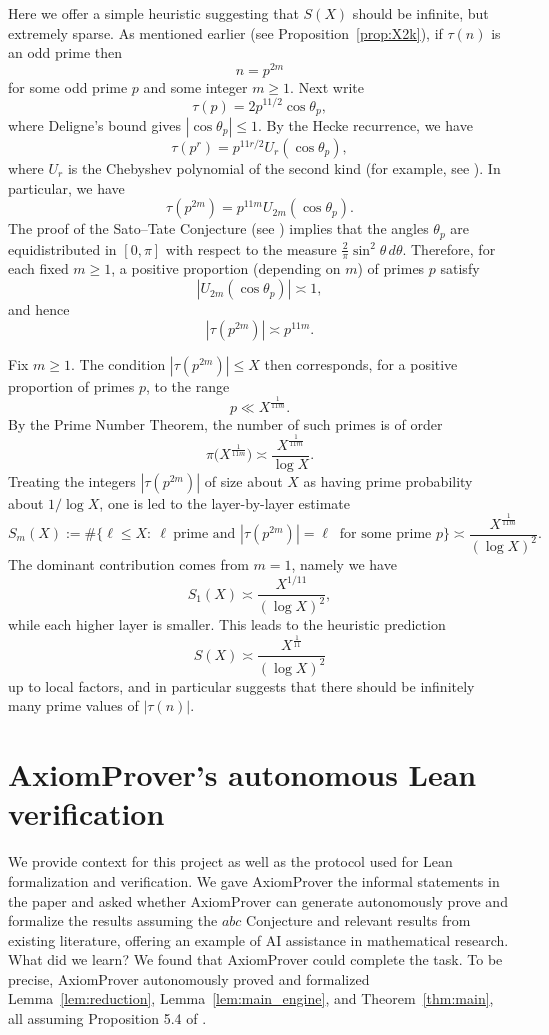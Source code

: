 \documentclass[12pt]{amsart}
\theoremstyle{remark}
\numberwithin{equation}{section}
\begin{document}
Here we offer a simple heuristic suggesting that $S(X)$ should be infinite, but extremely sparse.
As mentioned earlier (see Proposition~\ref{prop:X2k}),
if $\tau(n)$ is an odd prime then
\[ n=p^{2m} \]
for some odd prime $p$ and some integer $m\ge 1$. Next write
\[
\tau(p)=2p^{11/2}\cos\theta_p,
\]
where Deligne's bound gives $\left\lvert \cos\theta_p \right\rvert \le 1$. By the Hecke recurrence, we have
\[
\tau(p^r)=p^{11r/2}U_r(\cos\theta_p),
\]
where $U_r$ is the Chebyshev polynomial of the second kind (for example, see \cite{MasonHandscomb2002}). In particular, we have
\[
\tau(p^{2m})=p^{11m}U_{2m}(\cos\theta_p).
\]
The proof of the Sato--Tate Conjecture (see \cite{BarnetLambGeeGeraghty2011})
implies that the angles $\theta_p$ are equidistributed in $[0,\pi]$
with respect to the measure $\frac{2}{\pi}\sin^2\theta\,d\theta$.
Therefore, for each fixed $m\ge 1$, a positive proportion (depending on $m$) of primes $p$ satisfy
\[
|U_{2m}(\cos\theta_p)|\asymp 1,
\]
and hence
\[
|\tau(p^{2m})|\asymp p^{11m}.
\]

Fix $m\ge 1$. The condition $|\tau(p^{2m})|\le X$ then corresponds, for a positive proportion of primes $p$, to the range
\[
p\ll X^{\frac{1}{11m}}.
\]
By the Prime Number Theorem, the number of such primes is of order
\[
\pi\bigl(X^{\frac{1}{11m}}\bigr)\asymp \frac{X^{\frac{1}{11m}}}{\log X}.
\]
Treating the integers $|\tau(p^{2m})|$ of size about $X$ as having prime probability about $1/\log X$, one is led to the layer-by-layer estimate
\[
S_m(X):=\#\{\ell\le X:\ \ell\ \text{prime and } |\tau(p^{2m})|=\ell\ \text{ for some prime }p\}
\asymp \frac{X^{\frac{1}{11m}}}{(\log X)^2}.
\]
The dominant contribution comes from $m=1$, namely we have
\[
S_1(X)\asymp \frac{X^{1/11}}{(\log X)^2},
\]
while each higher layer is smaller. This leads to the heuristic prediction
\[
S(X) \asymp \frac{X^{\frac{1}{11}}}{(\log X)^2}
\]
up to local factors, and in particular suggests that there should be infinitely many prime values of $|\tau(n)|$.



\bigskip

\section{AxiomProver's autonomous Lean verification}\label{sec:AI}
We provide context for this project as well as the protocol used for Lean
formalization and verification. We gave AxiomProver the informal statements in the paper and asked whether AxiomProver
can generate autonomously prove and formalize the results assuming the $abc$ Conjecture and relevant results from existing literature, offering an example of AI assistance in mathematical research.
What did we learn? We found that AxiomProver could complete the task.
To be precise, AxiomProver autonomously proved and formalized
Lemma~\ref{lem:reduction}, Lemma~\ref{lem:main_engine},
and Theorem~\ref{thm:main}, all assuming Proposition 5.4 of \cite{Xiong2025}.
\end{document}
